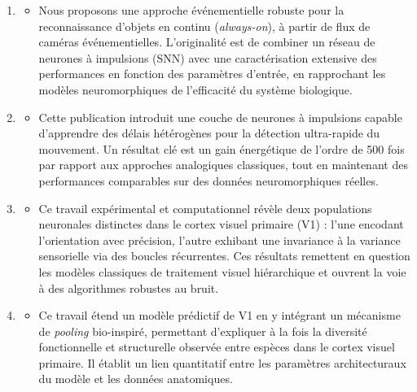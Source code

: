 \documentclass[10pt,french,a4paper]{article}%
\begin{document}
\begin{enumerate}
\item[A55] %
\begin{itemize}
  \item Nous proposons une approche événementielle robuste pour la reconnaissance d'objets en continu (\emph{always-on}), à partir de flux de caméras événementielles. L'originalité est de combiner un réseau de neurones à impulsions (SNN) avec une caractérisation extensive des performances en fonction des paramètres d'entrée, en rapprochant les modèles neuromorphiques de l'efficacité du système biologique.
\end{itemize}

\item[A54] %
\begin{itemize}
  \item Cette publication introduit une couche de neurones à impulsions capable d'apprendre des délais hétérogènes pour la détection ultra-rapide du mouvement. Un résultat clé est un gain énergétique de l'ordre de 500 fois par rapport aux approches analogiques classiques, tout en maintenant des performances comparables sur des données neuromorphiques réelles.
\end{itemize}

\item[A53] %
\begin{itemize}
  \item Ce travail expérimental et computationnel révèle deux populations neuronales distinctes dans le cortex visuel primaire (V1) : l'une encodant l'orientation avec précision, l'autre exhibant une invariance à la variance sensorielle via des boucles récurrentes. Ces résultats remettent en question les modèles classiques de traitement visuel hiérarchique et ouvrent la voie à des algorithmes robustes au bruit.
\end{itemize}

\item[A52] %
\begin{itemize}
  \item Ce travail étend un modèle prédictif de V1 en y intégrant un mécanisme de \emph{pooling} bio-inspiré, permettant d'expliquer à la fois la diversité fonctionnelle et structurelle observée entre espèces dans le cortex visuel primaire. Il établit un lien quantitatif entre les paramètres architecturaux du modèle et les données anatomiques.
\end{itemize}


\end{enumerate}
\end{document}

